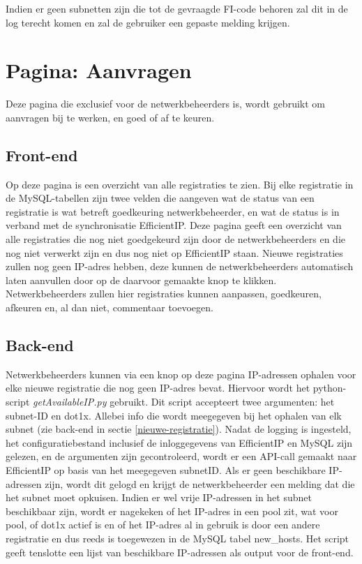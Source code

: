 Indien er geen subnetten zijn die tot de gevraagde FI-code behoren zal dit in de log terecht komen en zal de gebruiker een gepaste melding krijgen.

\section{Pagina: Aanvragen}
\label{aanvragen}
Deze pagina die exclusief voor de netwerkbeheerders is, wordt gebruikt om aanvragen bij te werken, en goed of af te keuren.

\subsection{Front-end}
Op deze pagina is een overzicht van alle registraties te zien. Bij elke registratie in de MySQL-tabellen zijn twee velden die aangeven wat de status van een registratie is wat betreft goedkeuring netwerkbeheerder, en wat de status is in verband met de synchronisatie EfficientIP. Deze pagina geeft een overzicht van alle registraties die nog niet goedgekeurd zijn door de netwerkbeheerders en die nog niet verwerkt zijn en dus nog niet op EfficientIP staan. Nieuwe registraties zullen nog geen IP-adres hebben, deze kunnen de netwerkbeheerders automatisch laten aanvullen door op de daarvoor gemaakte knop te klikken.
Netwerkbeheerders zullen hier registraties kunnen aanpassen, goedkeuren, afkeuren en, al dan niet, commentaar toevoegen.

\subsection{Back-end}
Netwerkbeheerders kunnen via een knop op deze pagina IP-adressen ophalen voor elke nieuwe registratie die nog geen IP-adres bevat.
Hiervoor wordt het python-script \textit{getAvailableIP.py} gebruikt. Dit script accepteert twee argumenten: het subnet-ID  en dot1x. Allebei info die wordt meegegeven bij het ophalen van elk subnet (zie back-end in sectie \ref{nieuwe-registratie}). Nadat de logging is ingesteld, het configuratiebestand inclusief de inloggegevens van EfficientIP en MySQL zijn gelezen, en de argumenten zijn gecontroleerd, wordt er een API-call gemaakt naar EfficientIP op basis van het meegegeven subnetID. Als er geen beschikbare IP-adressen zijn, wordt dit gelogd en krijgt de netwerkbeheerder een melding dat die het subnet moet opkuisen.
Indien er wel vrije IP-adressen in het subnet beschikbaar zijn, wordt er nagekeken of het IP-adres in een pool zit, wat voor pool, of dot1x actief is en of het IP-adres al in gebruik is door een andere registratie en dus reeds is toegewezen in de MySQL tabel new\_hosts. Het script geeft tenslotte een lijst van beschikbare IP-adressen als output voor de front-end.

